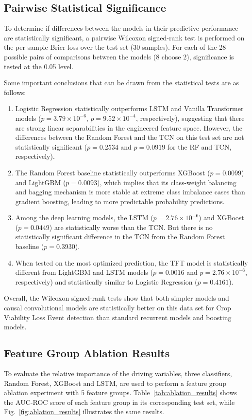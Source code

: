 \documentclass{ieeeaccess}
\begin{document}
\subsection{Pairwise Statistical Significance}
To determine if differences between the models in their predictive performance are statistically significant, a pairwise Wilcoxon signed-rank test is performed on the per-sample Brier loss over the test set (30 samples). For each of the 28 possible pairs of comparisons between the models (8 choose 2), significance is tested at the 0.05 level.

Some important conclusions that can be drawn from the statistical tests are as follows:
\begin{enumerate}
    \item Logistic Regression statistically outperforms LSTM and Vanilla Transformer models  ($p = 3.79 \times 10^{-6}$, $p = 9.52 \times 10^{-4}$, respectively), suggesting that there are strong linear separabilities in the engineered feature space. However, the differences between the Random Forest and the TCN on this test set are not statistically significant ($p = 0.2534$ and $p = 0.0919$ for the RF and TCN, respectively).
    \item The Random Forest baseline statistically outperforms XGBoost ($p = 0.0099$) and LightGBM ($p = 0.0093$), which implies that its class-weight balancing and bagging mechanism is more stable at extreme class imbalance cases than gradient boosting, leading to more predictable probability predictions.
    \item Among the deep learning models, the LSTM ($p = 2.76 \times 10^{-6}$) and XGBoost ($p = 0.0449$) are statistically worse than the TCN. But there is no statistically significant difference in the TCN from the Random Forest baseline ($p = 0.3930$).
    \item When tested on the most optimized prediction, the TFT model is statistically different from LightGBM and LSTM models ($p = 0.0016$ and $p = 2.76 \times 10^{-6}$, respectively) and statistically similar to Logistic Regression ($p = 0.4161$).
\end{enumerate}
Overall, the Wilcoxon signed-rank tests show that both simpler models and causal convolutional models are statistically better on this data set for Crop Viability Loss Event detection than standard recurrent models and boosting models.

\subsection{Feature Group Ablation Results}
To evaluate the relative importance of the driving variables, three classifiers, Random Forest, XGBoost and LSTM, are used to perform a feature group ablation experiment with 5 feature groups. Table~\ref{tab:ablation_results} shows the AUC-ROC score of each feature group in its corresponding test set, while Fig.~\ref{fig:ablation_results} illustrates the same results.
\end{document}
